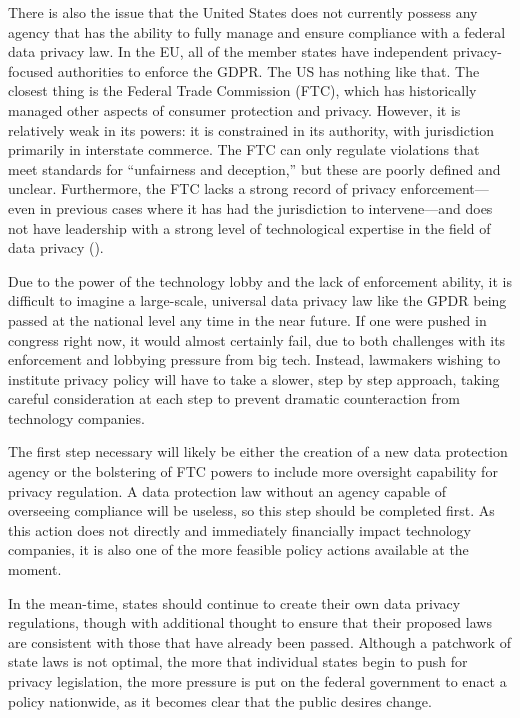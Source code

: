 \documentclass[water,article,submit,moreauthors,pdftex]{mdpi}
\begin{document}
There is also the issue that the United States does not currently
possess any agency that has the ability to fully manage and ensure
compliance with a federal data privacy law. In the EU, all of the member
states have independent privacy-focused authorities to enforce the GDPR.
The US has nothing like that. The closest thing is the Federal Trade
Commission (FTC), which has historically managed other aspects of
consumer protection and privacy. However, it is relatively weak in its
powers: it is constrained in its authority, with jurisdiction primarily
in interstate commerce. The FTC can only regulate violations that meet
standards for ``unfairness and deception,'' but these are poorly defined
and unclear. Furthermore, the FTC lacks a strong record of privacy
enforcement---even in previous cases where it has had the jurisdiction
to intervene---and does not have leadership with a strong level of
technological expertise in the field of data privacy
(\citet{new-america}).

Due to the power of the technology lobby and the lack of enforcement
ability, it is difficult to imagine a large-scale, universal data
privacy law like the GPDR being passed at the national level any time in
the near future. If one were pushed in congress right now, it would
almost certainly fail, due to both challenges with its enforcement and
lobbying pressure from big tech. Instead, lawmakers wishing to institute
privacy policy will have to take a slower, step by step approach, taking
careful consideration at each step to prevent dramatic counteraction
from technology companies.

The first step necessary will likely be either the creation of a new
data protection agency or the bolstering of FTC powers to include more
oversight capability for privacy regulation. A data protection law
without an agency capable of overseeing compliance will be useless, so
this step should be completed first. As this action does not directly
and immediately financially impact technology companies, it is also one
of the more feasible policy actions available at the moment.

In the mean-time, states should continue to create their own data
privacy regulations, though with additional thought to ensure that their
proposed laws are consistent with those that have already been passed.
Although a patchwork of state laws is not optimal, the more that
individual states begin to push for privacy legislation, the more
pressure is put on the federal government to enact a policy nationwide,
as it becomes clear that the public desires change.
\end{document}
